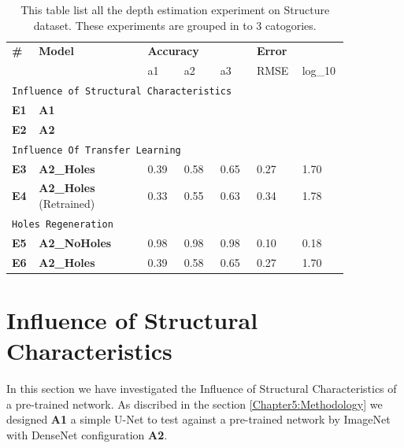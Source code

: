 \begin{table}[b]
\begin{tabular}{p{0.05\linewidth}p{0.3\linewidth}p{0.1\linewidth}p{0.1\linewidth}p{0.1\linewidth}p{0.1\linewidth}p{0.1\linewidth}}
\hline
\textbf{\#} & \textbf{Model} & \multicolumn{3}{l}{\textbf{Accuracy}} & \multicolumn{2}{l}{\textbf{Error}} \\ \cline{3-7} 
                    &                        & a1       & a2       & a3      & RMSE         & log\_10      \\ \hline
\multicolumn{7}{l}{\texttt{Influence of Structural Characteristics}}                                            \\ \hline
\textbf{E1}                  &  \textbf{A1}               &          &          &         &             &              \\ \hline
\textbf{E2}                  & \textbf{A2}                  &          &          &         &             &              \\ \hline
\multicolumn{7}{l}{\texttt{Influence Of Transfer Learning}}                                                                   \\ \hline
\textbf{E3}                  & \textbf{A2\_Holes}              & 0.39   & 0.58   & 0.65  & 0.27      & 1.70       \\ \hline
\textbf{E4}                  & \textbf{A2\_Holes} (Retrained) & 0.33   & 0.55   & 0.63  & 0.34      & 1.78       \\ \hline
\multicolumn{7}{l}{\texttt{Holes Regeneration}}                                                       \\ \hline
\textbf{E5}                  & \textbf{A2\_NoHoles}            & 0.98   & 0.98   & 0.98  & 0.10       & 0.18        \\ \hline
\textbf{E6}                  & \textbf{A2\_Holes}              & 0.39   & 0.58   & 0.65  & 0.27      & 1.70       \\ \hline
\end{tabular}

\caption{This table list all the depth estimation experiment on Structure dataset. These experiments are grouped in to 3 catogories.}
\label{table:Results_main}
\end{table}


\section{Influence of Structural Characteristics}
\label{Chapter6:Influence_Structural_Char}
In this section we have investigated the Influence of Structural Characteristics of a pre-trained network.  As discribed in the section \ref{Chapter5:Methodology} we designed \textbf{A1} a simple U-Net to test against a pre-trained network by ImageNet with DenseNet configuration \textbf{A2}. 
 
